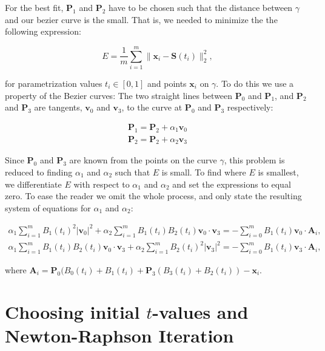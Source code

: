 \documentclass[10pt]{article}
\begin{document}
For the best fit, $\mathbf{P}_1$ and $\mathbf{P}_2$ have to be chosen such that the distance between $\gamma$ and our bezier curve is the small. That is, we needed to minimize the the following expression:

\begin{equation}
E = \frac{1}{m} \sum_{i=1}^{m} \| \mathbf{x}_i - \mathbf{S}(t_i)\|^2_2,
\end{equation}

for parametrization values $t_i \in [ 0,1 ]$ and points $\mathbf{x}_i$ on $\gamma$. To do this we use a property of the Bezier curves: The two straight lines between $\mathbf{P}_0$ and $\mathbf{P}_1$, and $\mathbf{P}_2$ and $\mathbf{P}_3$ are tangents, $\mathbf{v}_0$ and $\mathbf{v}_3$, to the curve at $\mathbf{P}_0$ and $\mathbf{P}_3$ respectively:

\begin{align}
\mathbf{P}_1 = \mathbf{P}_2 + \alpha_1 \mathbf{v}_0 \\
\mathbf{P}_2 = \mathbf{P}_2 + \alpha_2 \mathbf{v}_3
\end{align}

Since $\mathbf{P}_0$ and $\mathbf{P}_3$ are known from the points on the curve $\gamma$, this problem is reduced to finding $\alpha_1$ and $\alpha_2$ such that $E$ is small. To find where $E$ is smallest, we differentiate $E$ with respect to $\alpha_1$ and $\alpha_2$ and set the expressions to equal zero. To ease the reader we omit the whole process, and only state the resulting system of equations for $\alpha_1$ and $\alpha_2$:


\begin{align}
\alpha_1 \sum_{i = 1}^m B_1(t_i)^2 |\mathbf{v}_0|^2 + \alpha_2 \sum_{i = 1}^m B_1(t_i)B_2(t_i)\mathbf{v}_0 \cdot \mathbf{v}_3 
= - \sum_{i = 0}^m B_1(t_i) \mathbf{v}_0 \cdot \mathbf{A}_i, \\
\alpha_1 \sum_{i = 1}^m B_1(t_i)B_2(t_i)\mathbf{v}_0 \cdot \mathbf{v}_3 + \alpha_2 \sum_{i = 1}^m B_2(t_i)^2 |\mathbf{v}_3|^2 
= - \sum_{i = 0}^m B_1(t_i)\mathbf{v}_3 \cdot \mathbf{A}_i,
\end{align}

where $\mathbf{A}_i = \mathbf{P}_0(B_0(t_i) + B_1(t_i) + \mathbf{P}_3(B_3(t_i) + B_2(t_i)) - \mathbf{x}_i$.





\section*{Choosing initial $t$-values and Newton-Raphson Iteration}
\end{document}
